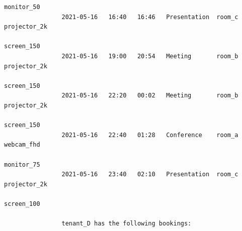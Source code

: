 \documentclass{article}
\begin{document}
\begin{Verbatim}[gobble=8]
                                                                    monitor_50
                2021-05-16   16:40   16:46   Presentation  room_c   projector_2k
                                                                    screen_150
                2021-05-16   19:00   20:54   Meeting       room_b   projector_2k
                                                                    screen_150
                2021-05-16   22:20   00:02   Meeting       room_b   projector_2k
                                                                    screen_150
                2021-05-16   22:40   01:28   Conference    room_a   webcam_fhd
                                                                    monitor_75
                2021-05-16   23:40   02:10   Presentation  room_c   projector_2k
                                                                    screen_100
                
                tenant_D has the following bookings:
                

\end{Verbatim}
\end{document}
